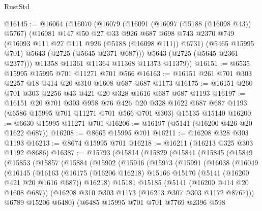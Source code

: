 \begin{lexlean}{RustStd}
\begin{coremodule}
@16145 := @16064
    (@16070
      (@16079
        (@16091
          (@16097 (@5188 (@16098 @43)) @5767)
          (@16081
            @147
            @50
            @27
            @33
            @926
            @687
            @698
            @743
            @2370
            @749
            (@16093 @111 @27 @111 @926 (@5188 (@16098 @111)) @6731)
            (@5465 @15995 @701)
            @5643
            (@2725 (@5645 @2371 @687)))
          @5643
          (@2725 (@5645 @2361 @2377)))
        @11358
        @11361
        @11364
        @11368
        @11373
        @11379))
@16151 := @6535 @15995 @15995 @701 @11271 @701 @566
@16163 := @16151 @261 @701 @303 @2257 @18 @414 @20 @310 @1608 @687 @687 @1173
@16175 := @16151 @260 @701 @303 @2256 @43 @421 @20 @328 @1616 @687 @687 @1193
@16197 := @16151
    @20
    @701
    @303
    @958
    @76
    @426
    @20
    @328
    @1622
    @687
    @687
    @1193
    (@6586 @15995 @701 @11271 @701 @566 @701 @303)
    @15135
    @15140
@16200 := @6630 @15995 @11271 @701
@16206 := @16197 (@5141 (@16200 @426 @20 @1622 @687))
@16208 := @8665 @15995 @701
@16211 := @16208 @328 @303 @1193
@16213 := @8674 @15995 @701
@16218 := @16211 (@16213 @325 @303 @1192 @8686)
@16387 := @15793
    (@15814
      (@15829
        (@15841
          (@15845
            (@15849
              (@15853
                (@15857
                  (@15884
                    (@15902
                      (@15946
                        (@15973
                          (@15991
                            (@16038
                              (@16049
                                (@16145
                                  (@16163
                                    (@16175
                                      (@16206 @16218)
                                      @15166
                                      @15170
                                      (@5141 (@16200 @421 @20 @1616 @687))
                                      @16218)
                                    @15181
                                    @15185
                                    (@5141 (@16200 @414 @20 @1608 @687))
                                    (@16208 @310 @303 @1173 (@16213 @307 @303 @1172 @8767)))
                                  @6789
                                  @15206
                                  @6480)
                                (@6485
                                  @15995
                                  @701
                                  @701
                                  @7769
                                  @2396
                                  @598

\end{coremodule}
\end{lexlean}
